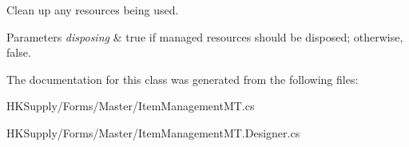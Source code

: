 Clean up any resources being used. 


\begin{DoxyParams}{Parameters}
{\em disposing} & true if managed resources should be disposed; otherwise, false.\\
\hline
\end{DoxyParams}


The documentation for this class was generated from the following files\+:\begin{DoxyCompactItemize}
\item 
H\+K\+Supply/\+Forms/\+Master/Item\+Management\+M\+T.\+cs\item 
H\+K\+Supply/\+Forms/\+Master/Item\+Management\+M\+T.\+Designer.\+cs\end{DoxyCompactItemize}
